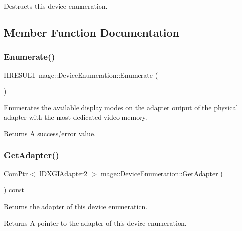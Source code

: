 Destructs this device enumeration. 

\subsection{Member Function Documentation}
\hypertarget{classmage_1_1_device_enumeration_a4fea0ffef733632456b281f74608a239}{}\label{classmage_1_1_device_enumeration_a4fea0ffef733632456b281f74608a239} 
\subsubsection{\texorpdfstring{Enumerate()}{Enumerate()}}
{\footnotesize\ttfamily H\+R\+E\+S\+U\+LT mage\+::\+Device\+Enumeration\+::\+Enumerate (\begin{DoxyParamCaption}{ }\end{DoxyParamCaption})\hspace{0.3cm}{\ttfamily [private]}}

Enumerates the available display modes on the adapter output of the physical adapter with the most dedicated video memory.

\begin{DoxyReturn}{Returns}
A success/error value. 
\end{DoxyReturn}
\hypertarget{classmage_1_1_device_enumeration_ac7b5e28561c607aa02b521a81164715c}{}\label{classmage_1_1_device_enumeration_ac7b5e28561c607aa02b521a81164715c} 
\subsubsection{\texorpdfstring{Get\+Adapter()}{GetAdapter()}}
{\footnotesize\ttfamily \hyperlink{namespacemage_ae74f374780900893caa5555d1031fd79}{Com\+Ptr}$<$ I\+D\+X\+G\+I\+Adapter2 $>$ mage\+::\+Device\+Enumeration\+::\+Get\+Adapter (\begin{DoxyParamCaption}{ }\end{DoxyParamCaption}) const\hspace{0.3cm}{\ttfamily [noexcept]}}

Returns the adapter of this device enumeration.

\begin{DoxyReturn}{Returns}
A pointer to the adapter of this device enumeration. 
\end{DoxyReturn}
\hypertarget{classmage_1_1_device_enumeration_aa7a073568788fa4fb3d90c2869527e78}{}\label{classmage_1_1_device_enumeration_aa7a073568788fa4fb3d90c2869527e78} 
